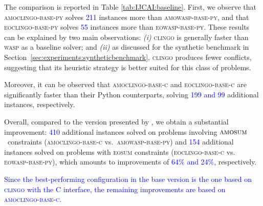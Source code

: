 \documentclass[preprint,authoryear]{elsarticle}
\newcommand{\amowaspij}{\textsc{amowasp-base-py}\xspace}
\newcommand{\amoclingoijpy}{\textsc{amoclingo-base-py}\xspace}
\newcommand{\amoclingoijc}{\textsc{amoclingo-base-c}\xspace}
\newcommand{\eowaspij}{\textsc{eowasp-base-py}\xspace}
\newcommand{\eoclingoijpy}{\textsc{eoclingo-base-py}\xspace}
\newcommand{\eoclingoijc}{\textsc{eoclingo-base-c}\xspace}
\theoremstyle{definition}
\def\amosum{\ensuremath{\textsc{amosum}}\xspace}
\begin{document}
The comparison is reported in Table \ref{tab:IJCAI:baseline}.
First, we observe that \amoclingoijpy solves \textcolor{blue}{211} instances more than \amowaspij, and that \eoclingoijpy solves \textcolor{blue}{55} instances more than \eowaspij.  
These results can be explained by two main observations:  
\textit{(i)} \textsc{clingo} is generally faster than \textsc{wasp} as a baseline solver; and  
\textit{(ii)} as discussed for the synthetic benchmark in Section~\ref{sec:experiments:syntheticbenchmark}, \textsc{clingo} produces fewer conflicts, suggesting that its heuristic strategy is better suited for this class of problems.

Moreover, it can be observed that \amoclingoijc and \eoclingoijc are significantly faster than their Python counterparts, solving \textcolor{blue}{199 and 99} additional instances, respectively.

Overall, compared to the version presented by \cite{DBLP:conf/ijcai/AlvianoDFM24}, we obtain a substantial improvement: \textcolor{blue}{410} additional instances solved on problems involving \amosum\ constraints (\amoclingoijc vs.\ \amowaspij) and \textcolor{blue}{154} additional instances solved on problems with \textsc{eosum} constraints (\eoclingoijc vs. \eowaspij), which amounts to  %
improvements of \textcolor{blue}{64\% and 24\%}, respectively.

\textcolor{blue}{Since the best-performing configuration in the base version is the one based on \textsc{clingo} with the C interface, the remaining improvements are based on \amoclingoijc.}
\end{document}
